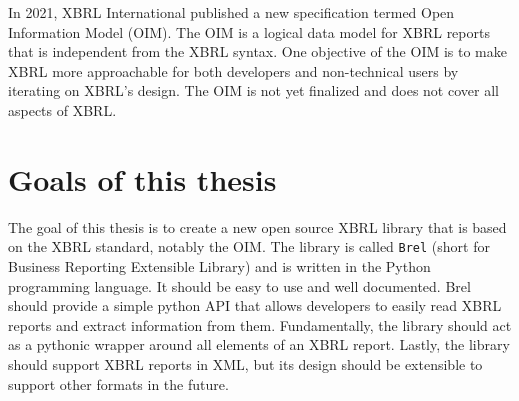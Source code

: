 In 2021, XBRL International published a new specification termed Open Information Model (OIM)\cite{oim}.
The OIM is a logical data model for XBRL reports that is independent from the XBRL syntax.
One objective of the OIM is to make XBRL more approachable for both developers and non-technical users by iterating on XBRL's design.
The OIM is not yet finalized and does not cover all aspects of XBRL. 


\section{Goals of this thesis}
\label{sec:goals}

The goal of this thesis is to create a new open source XBRL library that is based on the XBRL standard, notably the OIM.
The library is called \texttt{Brel} (short for Business Reporting Extensible Library) and is written in the Python programming language.
It should be easy to use and well documented.
Brel should provide a simple python API that allows developers to easily read XBRL reports and extract information from them.
Fundamentally, the library should act as a pythonic wrapper around all elements of an XBRL report.
Lastly, the library should support XBRL reports in XML, but its design should be extensible to support other formats in the future.

